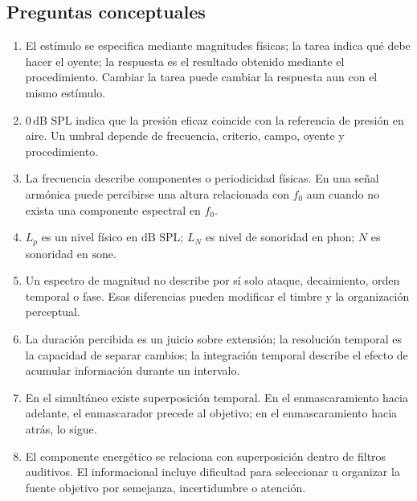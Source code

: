 \subsection*{Preguntas conceptuales}

\begin{enumerate}[label=\textbf{C\arabic*.},leftmargin=*]
    \item El estímulo se especifica mediante magnitudes físicas; la tarea
    indica qué debe hacer el oyente; la respuesta es el resultado obtenido
    mediante el procedimiento. Cambiar la tarea puede cambiar la respuesta aun
    con el mismo estímulo.

    \item \(0\,\text{dB SPL}\) indica que la presión eficaz coincide con la
    referencia de presión en aire. Un umbral depende de frecuencia, criterio,
    campo, oyente y procedimiento.

    \item La frecuencia describe componentes o periodicidad físicas. En una
    señal armónica puede percibirse una altura relacionada con \(f_0\) aun
    cuando no exista una componente espectral en \(f_0\).

    \item \(L_p\) es un nivel físico en \(\text{dB SPL}\); \(L_N\) es nivel
    de sonoridad en \(\text{phon}\); \(N\) es sonoridad en
    \(\text{sone}\).

    \item Un espectro de magnitud no describe por sí solo ataque, decaimiento,
    orden temporal o fase. Esas diferencias pueden modificar el timbre y la
    organización perceptual.

    \item La duración percibida es un juicio sobre extensión; la resolución
    temporal es la capacidad de separar cambios; la integración temporal
    describe el efecto de acumular información durante un intervalo.

    \item En el simultáneo existe superposición temporal. En el
    enmascaramiento hacia adelante, el enmascarador precede al objetivo; en el
    enmascaramiento hacia atrás, lo sigue.

    \item El componente energético se relaciona con superposición dentro de
    filtros auditivos. El informacional incluye dificultad para seleccionar u
    organizar la fuente objetivo por semejanza, incertidumbre o atención.


\end{enumerate}
